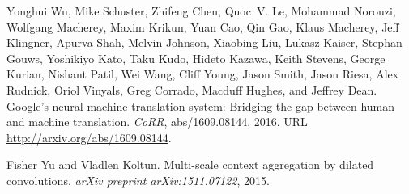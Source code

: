 \documentclass{article}
\begin{document}
\begin{thebibliography}{24}
Yonghui Wu, Mike Schuster, Zhifeng Chen, Quoc~V. Le, Mohammad Norouzi, Wolfgang
  Macherey, Maxim Krikun, Yuan Cao, Qin Gao, Klaus Macherey, Jeff Klingner,
  Apurva Shah, Melvin Johnson, Xiaobing Liu, Lukasz Kaiser, Stephan Gouws,
  Yoshikiyo Kato, Taku Kudo, Hideto Kazawa, Keith Stevens, George Kurian,
  Nishant Patil, Wei Wang, Cliff Young, Jason Smith, Jason Riesa, Alex Rudnick,
  Oriol Vinyals, Greg Corrado, Macduff Hughes, and Jeffrey Dean.
\newblock Google's neural machine translation system: Bridging the gap between
  human and machine translation.
\newblock \emph{CoRR}, abs/1609.08144, 2016.
\newblock URL \url{http://arxiv.org/abs/1609.08144}.

Fisher Yu and Vladlen Koltun.
\newblock Multi-scale context aggregation by dilated convolutions.
\newblock \emph{arXiv preprint arXiv:1511.07122}, 2015.

\end{thebibliography}
\end{document}
